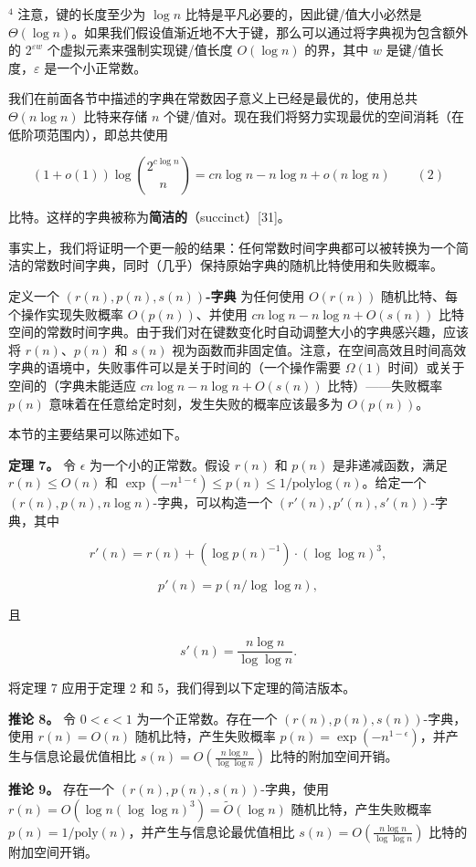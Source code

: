 \documentclass[12pt,a4paper]{ctexart}
\theoremstyle{remark}
\begin{document}
$^4$ 注意，键的长度至少为 $\log n$ 比特是平凡必要的，因此键/值大小必然是 $\Theta(\log n)$。如果我们假设值渐近地不大于键，那么可以通过将字典视为包含额外的 $2^{\varepsilon w}$ 个虚拟元素来强制实现键/值长度 $O(\log n)$ 的界，其中 $w$ 是键/值长度，$\varepsilon$ 是一个小正常数。

我们在前面各节中描述的字典在常数因子意义上已经是最优的，使用总共 $\Theta(n\log n)$ 比特来存储 $n$ 个键/值对。现在我们将努力实现最优的空间消耗（在低阶项范围内），即总共使用

$$(1+o(1))\log\binom{2^{c\log n}}{n}=cn\log n-n\log n+o(n\log n)\qquad(2)$$

比特。这样的字典被称为\textbf{简洁的}（succinct）[31]。

事实上，我们将证明一个更一般的结果：任何常数时间字典都可以被转换为一个简洁的常数时间字典，同时（几乎）保持原始字典的随机比特使用和失败概率。

定义一个 $(r(n),p(n),s(n))$\textbf{-字典} 为任何使用 $O(r(n))$ 随机比特、每个操作实现失败概率 $O(p(n))$、并使用 $cn\log n-n\log n+O(s(n))$ 比特空间的常数时间字典。由于我们对在键数变化时自动调整大小的字典感兴趣，应该将 $r(n)$、$p(n)$ 和 $s(n)$ 视为函数而非固定值。注意，在空间高效且时间高效字典的语境中，失败事件可以是关于时间的（一个操作需要 $\Omega(1)$ 时间）或关于空间的（字典未能适应 $cn\log n-n\log n+O(s(n))$ 比特）——失败概率 $p(n)$ 意味着在任意给定时刻，发生失败的概率应该最多为 $O(p(n))$。

本节的主要结果可以陈述如下。

\textbf{定理 7。} 令 $\epsilon$ 为一个小的正常数。假设 $r(n)$ 和 $p(n)$ 是非递减函数，满足 $r(n)\leq O(n)$ 和 $\exp(-n^{1-\epsilon})\leq p(n)\leq 1/\text{polylog}(n)$。给定一个 $(r(n),p(n),n\log n)$-字典，可以构造一个 $(r'(n),p'(n),s'(n))$-字典，其中

$$r'(n)=r(n)+(\log p(n)^{-1})\cdot(\log\log n)^3,$$

$$p'(n)=p(n/\log\log n),$$

且

$$s'(n)=\frac{n\log n}{\log\log n}.$$

将定理 7 应用于定理 2 和 5，我们得到以下定理的简洁版本。

\textbf{推论 8。} 令 $0<\epsilon<1$ 为一个正常数。存在一个 $(r(n),p(n),s(n))$-字典，使用 $r(n)=O(n)$ 随机比特，产生失败概率 $p(n)=\exp(-n^{1-\epsilon})$，并产生与信息论最优值相比 $s(n)=O\left(\frac{n\log n}{\log\log n}\right)$ 比特的附加空间开销。

\textbf{推论 9。} 存在一个 $(r(n),p(n),s(n))$-字典，使用 $r(n)=O(\log n(\log\log n)^3)=\tilde{O}(\log n)$ 随机比特，产生失败概率 $p(n)=1/\text{poly}(n)$，并产生与信息论最优值相比 $s(n)=O\left(\frac{n\log n}{\log\log n}\right)$ 比特的附加空间开销。
\end{document}
